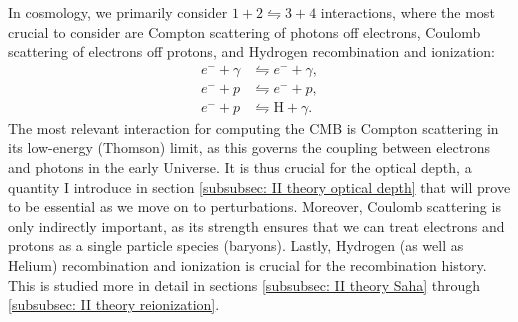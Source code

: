 \documentclass{aa}
\numberwithin{equation}{section}
\numberwithin{table}{section}
\numberwithin{figure}{section}
\begin{document}
In cosmology, we primarily consider $1+2 \leftrightharpoons 3+4$ interactions, where the most crucial to consider are Compton scattering of photons off electrons, Coulomb scattering of electrons off protons, and Hydrogen recombination and ionization:
\begin{align}
  e^- + \gamma &\leftrightharpoons e^- + \gamma, \\
  e^- + p &\leftrightharpoons e^- + p, \\
  e^- + p &\leftrightharpoons \text{H} + \gamma. \label{eq: Hydrogen recomb}
\end{align}
The most relevant interaction for computing the CMB is Compton scattering in its low-energy (Thomson) limit, as this governs the coupling between electrons and photons in the early Universe. It is thus crucial for the optical depth, a quantity I introduce in section \ref{subsubsec: II theory optical depth} that will prove to be essential as we move on to perturbations. 
Moreover, Coulomb scattering is only indirectly important, as its strength ensures that we can treat electrons and protons as a single particle species (baryons).
Lastly, Hydrogen (as well as Helium) recombination and ionization is crucial for the recombination history. This is studied more in detail in sections \ref{subsubsec: II theory Saha} through \ref{subsubsec: II theory reionization}. 

\end{document}
